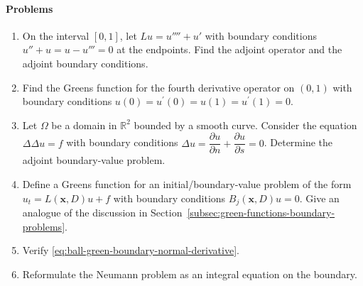 \paragraph*{Problems}

\begin{enumerate}[label=\thesection.\arabic*.,ref=\thesection.\arabic*,start=56,series=book-problems]

\item\label{ex:fourth-order-drift-adjoint-boundary} On the interval $[0,1]$, let $Lu=u''''+u'$ with boundary conditions $u''+u=u-u'''=0$ at the endpoints. Find the adjoint operator and the adjoint boundary conditions.

\item\label{ex:clamped-fourth-derivative-green-function} Find the Green\textquotesingle s function for the fourth derivative operator on $(0,1)$ with boundary conditions $u(0)=u^{\prime}(0)=u(1)=u^{\prime}(1)=0$.

\item\label{ex:biharmonic-normal-tangential-adjoint} Let $\Omega$ be a domain in $\mathbb{R}^2$ bounded by a smooth curve. Consider the equation $\Delta\Delta u=f$ with boundary conditions $\Delta u=\dfrac{\partial u}{\partial n}+\dfrac{\partial u}{\partial s}=0$. Determine the adjoint boundary-value problem.

\item\label{ex:evolution-initial-boundary-green-function} Define a Green\textquotesingle s function for an initial/boundary-value problem of the form $u_t=L(\bm{x},D)u+f$ with boundary conditions $B_j(\bm{x},D)u=0$. Give an analogue of the discussion in Section~\ref{subsec:green-functions-boundary-problems}.

\item\label{ex:verify-ball-green-normal-derivative} Verify \eqref{eq:ball-green-boundary-normal-derivative}.

\item\label{ex:neumann-boundary-integral-equation} Reformulate the Neumann problem as an integral equation on the boundary.

\end{enumerate}
